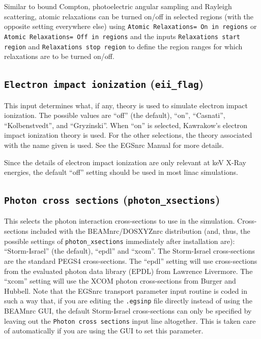 \documentclass[12pt,twoside]{article}
\begin{document}
Similar to bound Compton, photoelectric angular sampling and
Rayleigh scattering, atomic relaxations can be turned on/off in
selected regions (with the opposite setting everywhere else) using
{\tt Atomic Relaxations= On in regions} or
{\tt Atomic Relaxations= Off in regions} and the inputs
{\tt Relaxations start region} and {\tt Relaxations stop region} to define
the region ranges for which relaxations are to be turned on/off.

\subsection{ {\tt Electron impact ionization} ({\tt eii\_flag})}

This input determines what, if any, theory is used to simulate
electron impact ionization.  The possible values are
``off'' (the default), ``on'', ``Casnati'', ``Kolbenstvedt'',
and ``Gryzinski''.  When ``on'' is selected, Kawrakow's electron
impact ionization theory\cite{Ka02b} is used.  For the other selections,
the theory associated with the name given is used.  See
the EGSnrc Manual\cite{KR03} for more details.

Since the details of electron impact ionization are only relevant
at keV X-Ray energies, the default ``off'' setting should be used
in most linac simulations.

\subsection{ {\tt Photon cross sections} ({\tt photon\_xsections})}

This selects the photon interaction cross-sections to use in
the simulation.  Cross-sections included with the BEAMnrc/DOSXYZnrc
distribution (and, thus, the possible settings of
{\tt photon\_xsections} immediately after installation are):
``Storm-Israel'' (the default), ``epdl'' and ``xcom''.
The Storm-Israel cross-sections are the standard PEGS4 cross-sections.
The ``epdl'' setting will use cross-sections from
the evaluated photon data library (EPDL) from Lawrence Livermore\cite{Cu90}.
The ``xcom'' setting will use the XCOM
photon cross-sections from Burger and Hubbell\cite{BH87}.  Note that
the EGSnrc transport parameter input routine is coded in such a way that,
if you are editing the {\tt .egsinp} file directly instead of using
the BEAMnrc GUI, the default Storm-Israel cross-sections can only be
specified by leaving out the {\tt Photon cross sections} input line
altogether.  This is taken care of automatically if you are using the
GUI to set this parameter.
\end{document}
